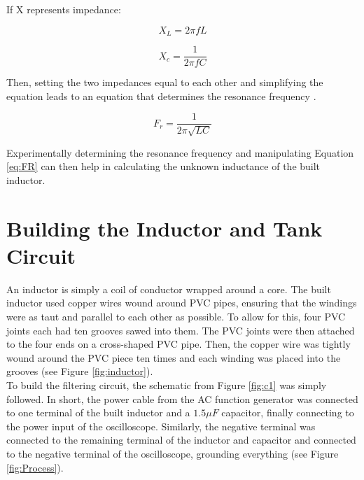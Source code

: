 \documentclass[journal]{IEEEtran}
\begin{document}
\noindent If X represents impedance:


\begin{equation}
X_{L}=2\pi fL
\label{eq:XL}
\end{equation}

\begin{equation}
X_{c}=\frac{1}{2\pi fC}
\label{eq:XC}
\end{equation}

\noindent Then, setting the two impedances equal to each other and simplifying the equation leads to an equation that determines the resonance frequency \cite{equations}.

\begin{equation}
F_{r}=\frac{1}{2\pi \sqrt{LC}}
\label{eq:FR}
\end{equation}

\noindent Experimentally determining the resonance frequency and manipulating Equation \ref{eq:FR} can then help in calculating the unknown inductance of the built inductor.

\section{Building the Inductor and Tank Circuit}

\noindent An inductor is simply a coil of conductor wrapped around a core. The built inductor used copper wires wound around PVC pipes, ensuring that the windings were as taut and parallel to each other as possible. To allow for this, four PVC joints each had ten grooves sawed into them. The PVC joints were then attached to the four ends on a cross-shaped PVC pipe. Then, the copper wire was tightly wound around the PVC piece ten times and each winding was placed into the grooves (see Figure \ref{fig:inductor}).\\

\noindent To build the filtering circuit, the schematic from Figure \ref{fig:c1} was simply followed. In short, the power cable from the AC function generator was connected to one terminal of the built inductor and a $1.5\mu F$ capacitor, finally connecting to the power input of the oscilloscope. Similarly, the negative terminal was connected to the remaining terminal of the inductor and capacitor and connected to the negative terminal of the oscilloscope, grounding everything (see Figure \ref{fig:Process}).
\end{document}
